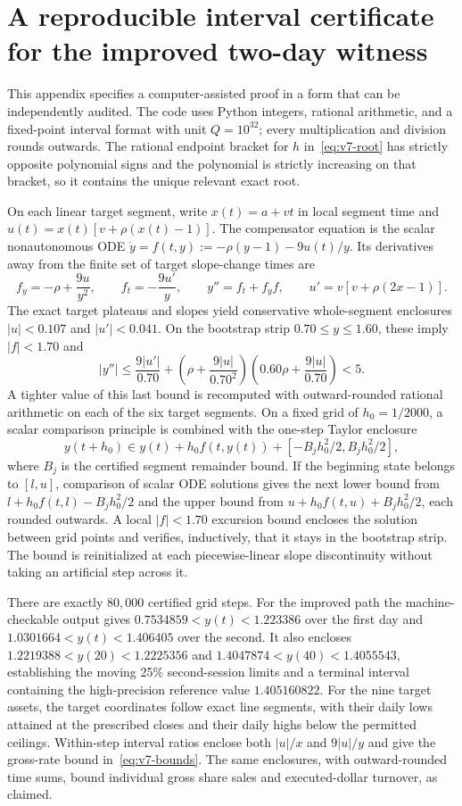 \documentclass[11pt]{article}
\numberwithin{equation}{section}
\theoremstyle{definition}
\theoremstyle{remark}
\begin{document}
\section{A reproducible interval certificate for the improved two-day witness}\label{app:v7certificate}
This appendix specifies a computer-assisted proof in a form that can be independently audited. The code  uses Python integers, rational arithmetic, and a fixed-point interval format with unit $Q=10^{32}$; every multiplication and division rounds outwards. The rational endpoint bracket for $h$ in~\eqref{eq:v7-root} has strictly opposite polynomial signs and the polynomial is strictly increasing on that bracket, so it contains the unique relevant exact root.

On each linear target segment, write $x(t)=a+vt$ in local segment time and $u(t)=x(t)[v+\rho(x(t)-1)]$. The compensator equation is the scalar nonautonomous ODE $\dot y=f(t,y):=-\rho(y-1)-9u(t)/y$. Its derivatives away from the finite set of target slope-change times are
\[
f_y=-\rho+\frac{9u}{y^2},\qquad f_t=-\frac{9u'}y,\qquad
 y''=f_t+f_y f,\qquad u'=v[v+\rho(2x-1)].
\]
The exact target plateaus and slopes yield conservative whole-segment enclosures $|u|<0.107$ and $|u'|<0.041$. On the bootstrap strip $0.70\le y\le1.60$, these imply $|f|<1.70$ and
\[
|y''|\le\frac{9|u'|}{0.70}
+\left(\rho+\frac{9|u|}{0.70^2}\right)
\left(0.60\rho+\frac{9|u|}{0.70}\right)<5.
\]
A tighter value of this last bound is recomputed with outward-rounded rational arithmetic on each of the six target segments. On a fixed grid of $h_0=1/2000$, a scalar comparison principle is combined with the one-step Taylor enclosure
\[
 y(t+h_0)\in y(t)+h_0 f(t,y(t))+[-B_j h_0^2/2,B_j h_0^2/2],
\]
where $B_j$ is the certified segment remainder bound. If the beginning state belongs to $[l,u]$, comparison of scalar ODE solutions gives the next lower bound from $l+h_0 f(t,l)-B_jh_0^2/2$ and the upper bound from $u+h_0 f(t,u)+B_jh_0^2/2$, each rounded outwards. A local $|f|<1.70$ excursion bound encloses the solution between grid points and verifies, inductively, that it stays in the bootstrap strip. The bound is reinitialized at each piecewise-linear slope discontinuity without taking an artificial step across it.

There are exactly $80,000$ certified grid steps. For the improved path the machine-checkable output gives $0.7534859<y(t)<1.223386$ over the first day and $1.0301664<y(t)<1.406405$ over the second. It also encloses $1.2219388<y(20)<1.2225356$ and
$1.4047874<y(40)<1.4055543$, establishing the moving 25\% second-session limits and a terminal interval containing the high-precision reference value $1.405160822$. For the nine target assets, the target coordinates follow exact line segments, with their daily lows attained at the prescribed closes and their daily highs below the permitted ceilings. Within-step interval ratios enclose both $|u|/x$ and $9|u|/y$ and give the gross-rate bound in~\eqref{eq:v7-bounds}. The same enclosures, with outward-rounded time sums, bound individual gross share sales and executed-dollar turnover, as claimed.
\end{document}
